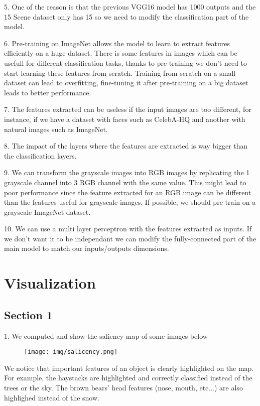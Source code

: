 5. One of the reason is that the previous VGG16 model has 1000 outputs and the 15 Scene dataset only has 15 so we need to modify the classification part of the model.

6. Pre-training on ImageNet allows the model to learn to extract features efficiently on a huge dataset. There is some features in images which can be usefull for different classification tasks, thanks to pre-training we don't need to start learning these features from scratch. Training from scratch on a small dataset can lead to overfitting, fine-tuning it after pre-training on a big dataset leads to better performance.

7. The features extracted can be useless if the input images are too different, for instance, if we have a dataset with faces such as CelebA-HQ and another with natural images such as ImageNet.

8. The impact of the layers where the features are extracted is way bigger than the classification layers.

9. We can transform the grayscale images into RGB images by replicating the 1 grayscale channel into 3 RGB channel with the same value. This might lead to poor performance since the feature extracted for an RGB image can be different than the features useful for grayscale images. If possible, we should pre-train on a grayscale ImageNet dataset.

10. We can use a multi layer perceptron with the features extracted as inputs. If we don't want it to be independant we can modify the fully-connected part of the main model to match our inputs/outputs dimensions.

\section{Visualization}

\subsection{Section 1}

1. We computed and show the saliency map of some images below
\begin{figure}[H]
  \centering
    \texttt{[image: img/salicency.png]}
\end{figure}
We notice that important features of an object is clearly highlighted on the map. For example, the haystacks are highlighted and correctly classified instead of the trees or the sky. The brown bears' head features (nose, mouth, etc...) are also highlighed instead of the snow.

